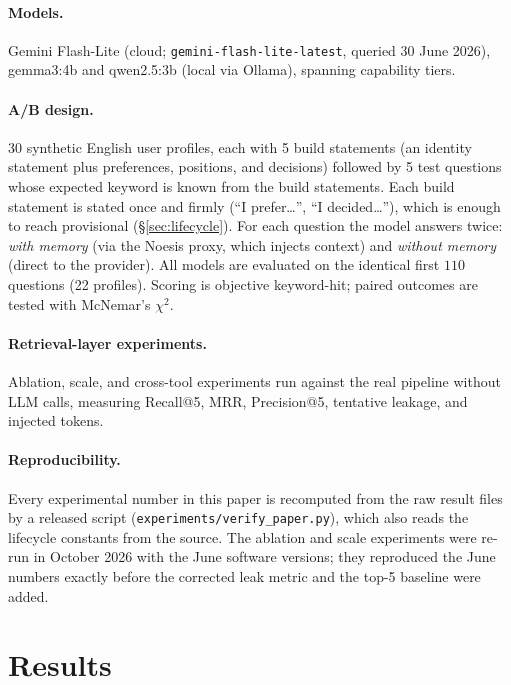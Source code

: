 \documentclass[11pt]{article}
\begin{document}
{\sloppy
\paragraph{Models.} Gemini Flash-Lite (cloud; \texttt{gemini-flash-}\allowbreak\texttt{lite-latest},
queried 30 June 2026), gemma3:4b and qwen2.5:3b (local via Ollama), spanning
capability tiers.\par}

\paragraph{A/B design.} 30 synthetic English user profiles, each with 5
build statements (an identity statement plus preferences, positions, and
decisions) followed by 5 test questions whose expected keyword is known from
the build statements. Each build statement is stated once and firmly (``I
prefer\ldots'', ``I decided\ldots''), which is enough to reach provisional
(\S\ref{sec:lifecycle}). For each question the model answers twice:
\emph{with memory} (via the Noesis proxy, which injects context) and
\emph{without memory} (direct to the provider). All models are evaluated on
the identical first $110$ questions (22 profiles). Scoring is objective
keyword-hit; paired outcomes are tested with McNemar's $\chi^2$.

\paragraph{Retrieval-layer experiments.} Ablation, scale, and cross-tool
experiments run against the real pipeline without LLM calls, measuring
Recall@5, MRR, Precision@5, tentative leakage, and injected tokens.

\paragraph{Reproducibility.} Every experimental number in this paper is
recomputed from the raw result files by a released script
(\texttt{experiments/verify\_paper.py}), which also reads the lifecycle
constants from the source. The ablation and scale experiments were re-run in
October 2026 with the June software versions; they reproduced the June
numbers exactly before the corrected leak metric and the top-5 baseline were
added.

\section{Results}
\label{sec:results}
\end{document}
